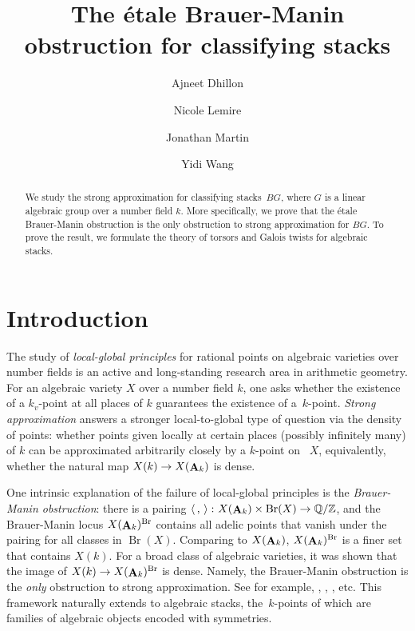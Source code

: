 \documentclass[12pt, final]{amsart}
\title[The \'{e}tale Brauer-Manin Obstruction]{ The \'{e}tale Brauer-Manin obstruction for classifying stacks}
\author[Ajneet Dhillon]{Ajneet Dhillon}
\author[Nicole Lemire]{Nicole Lemire}
\author[Jonathan Martin]{Jonathan Martin}
\author[Yidi Wang]{Yidi Wang}
\theoremstyle{remark}
\theoremstyle{definition}
\theoremstyle{plain}
\newcommand{\ZZ}{\mathbb{Z}}
\newcommand{\QQ}{\mathbb{Q}}
\DeclareMathOperator{\bA}{{\bf A}}
\DeclareMathOperator{\Br}{Br}
\begin{document}
\begin{abstract}  We study the strong approximation for classifying stacks~$BG$, where $G$ is a linear algebraic group over a number field $k$. More specifically, we prove that the \'etale Brauer-Manin obstruction is the only obstruction to strong approximation for $BG$. To prove the result, we formulate the theory of torsors and Galois twists for algebraic stacks.
\end{abstract}

\maketitle

\section{Introduction}

The study of \emph{local-global principles} for rational points on algebraic varieties over number fields is an active and long-standing research area in arithmetic geometry. For an algebraic variety $X$ over a number field $k$, one asks whether the existence of a $k_v$-point at all places of $k$ guarantees the existence of a~$k$-point. \emph{Strong approximation} answers a stronger local-to-global type of question via the density of points: whether points given locally at certain places (possibly infinitely many) of $k$ 
can be approximated arbitrarily closely by a $k$-point on ~$X$, equivalently, whether the natural map $X(k) \to X(\bA_k)$ is dense.

One intrinsic explanation of the failure of local-global principles is the 
\emph{Brauer-Manin obstruction}: there is a pairing $\left< \, ,\, \right>\colon X(\bA_k) \times \Br(X) \to \QQ/\ZZ$, and the Brauer-Manin locus $X(\bA_k)^{\Br}$ contains all adelic points that vanish under the pairing for all classes in $\Br(X)$. Comparing to $X(\bA_k)$, $X(\bA_k)^{\Br}$ is a finer set that contains $X(k)$.
For a broad class of algebraic varieties, it was shown that the image of $X(k) \to X(\bA_k)^{\Br}$ is dense. Namely, the Brauer-Manin obstruction is the \emph{only} obstruction to strong approximation. See for example, \cite{borovoi-demarche:13}, \cite{Demarche2010}, \cite{Harari2008}, etc.
This framework naturally extends to algebraic stacks, the~$k$-points of which are families of algebraic objects encoded with symmetries. 
\end{document}
